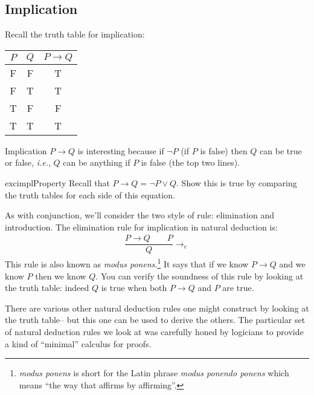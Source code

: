 \documentclass{article}
\theoremstyle{definition}
\newcommand{\ie}{\emph{i.e.}}
\begin{document}
\subsection{Implication}

Recall the truth table for implication:
%
\begin{center}
\begin{tabular}{cc|c}
  $P$ & $Q$ & $P \rightarrow Q$ \\ \hline
  \rowcolor{yellow} F & F & T \\
  \rowcolor{yellow} F & T & T \\
  T & F & F \\
  \rowcolor{yellow} T & T & T
\end{tabular}
\end{center}
%
Implication $P \rightarrow Q$ is interesting because if
$\neg P$ (if $P$ is false) then $Q$ can be true or false, \ie{},
$Q$ can be anything if $P$ is false (the top two lines). 

\begin{restatable}{exc}{implProperty}
Recall that $P \rightarrow Q = \neg P \vee Q$. Show this is true
by comparing the truth tables for each side of this equation.
\end{restatable}

As with conjunction, we'll consider the two style of 
rule: elimination and introduction.
The elimination rule for implication in natural deduction is:
\begin{align*}
\dfrac{P \rightarrow Q \qquad P}{Q} {\rightarrow_e}
\end{align*}
%
This rule is also known as \emph{modus ponens}.\footnote{\emph{modus
ponens} is short for the Latin phrase \emph{modus ponendo ponens}
which means ``the way that affirms by affirming''.} It says that if
we know $P \rightarrow Q$ and we know $P$ then we know $Q$. You can
verify the soundness of this rule by looking at the truth
table: indeed $Q$ is true when both $P \rightarrow Q$ and $P$ are
true.

There are various other natural deduction rules one might construct by
looking at the truth table-- but this one can be used to derive the
others. The particular set of natural deduction rules we look at was
carefully honed by logicians to provide a kind of ``minimal'' calculus
for proofs. 
\end{document}
